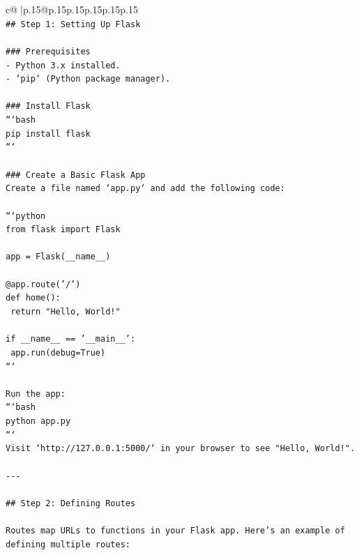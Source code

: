 \documentclass{article}
\begin{document}
{\begin{supertabular}{c@{$\;$}|p{.15\linewidth}@{}p{.15\linewidth}p{.15\linewidth}p{.15\linewidth}p{.15\linewidth}p{.15\linewidth}}
{{{\\ 
\texttt{\#\# Step 1: Setting Up Flask} \\
\\ 
\texttt{\#\#\# Prerequisites} \\
\texttt{{-} Python 3.x installed.} \\
\texttt{{-} `pip` (Python package manager).} \\
\\ 
\texttt{\#\#\# Install Flask} \\
\texttt{```bash} \\
\texttt{pip install flask} \\
\texttt{```} \\
\\ 
\texttt{\#\#\# Create a Basic Flask App} \\
\texttt{Create a file named `app.py` and add the following code:} \\
\\ 
\texttt{```python} \\
\texttt{from flask import Flask} \\
\\ 
\texttt{app = Flask(\_\_name\_\_)} \\
\\ 
\texttt{@app.route('/')} \\
\texttt{def home():} \\
\texttt{    return "Hello, World!"} \\
\\ 
\texttt{if \_\_name\_\_ == '\_\_main\_\_':} \\
\texttt{    app.run(debug=True)} \\
\texttt{```} \\
\\ 
\texttt{Run the app:} \\
\texttt{```bash} \\
\texttt{python app.py} \\
\texttt{```} \\
\texttt{Visit `http://127.0.0.1:5000/` in your browser to see "Hello, World!".} \\
\\ 
\texttt{{-}{-}{-}} \\
\\ 
\texttt{\#\# Step 2: Defining Routes} \\
\\ 
\texttt{Routes map URLs to functions in your Flask app. Here’s an example of defining multiple routes:} \\
}}}
\end{supertabular}}
\end{document}
